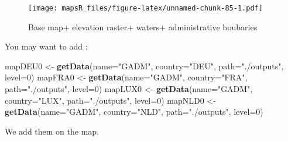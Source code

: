 \documentclass[]{report}
\newenvironment{Shaded}{\begin{snugshade}}{\end{snugshade}}
\newcommand{\KeywordTok}[1]{\textcolor[rgb]{0.13,0.29,0.53}{\textbf{{#1}}}}
\newcommand{\DataTypeTok}[1]{\textcolor[rgb]{0.13,0.29,0.53}{{#1}}}
\newcommand{\DecValTok}[1]{\textcolor[rgb]{0.00,0.00,0.81}{{#1}}}
\newcommand{\StringTok}[1]{\textcolor[rgb]{0.31,0.60,0.02}{{#1}}}
\newcommand{\OtherTok}[1]{\textcolor[rgb]{0.56,0.35,0.01}{{#1}}}
\newcommand{\NormalTok}[1]{{#1}}
\begin{document}
\begin{figure}[htbp]
\centering
\texttt{[image: mapsR\_files/figure-latex/unnamed-chunk-85-1.pdf]}
\caption{Base map+ elevation raster+ waters+ administrative boubaries}
\end{figure}

You may want to add :

\begin{Shaded}
\begin{Highlighting}[]
\NormalTok{mapDEU0 <-}\StringTok{ }\KeywordTok{getData}\NormalTok{(}\DataTypeTok{name=}\StringTok{"GADM"}\NormalTok{, }\DataTypeTok{country=}\StringTok{"DEU"}\NormalTok{, }\DataTypeTok{path=}\StringTok{"./outputs"}\NormalTok{, }\DataTypeTok{level=}\DecValTok{0}\NormalTok{)}
\NormalTok{mapFRA0 <-}\StringTok{ }\KeywordTok{getData}\NormalTok{(}\DataTypeTok{name=}\StringTok{"GADM"}\NormalTok{, }\DataTypeTok{country=}\StringTok{"FRA"}\NormalTok{, }\DataTypeTok{path=}\StringTok{"./outputs"}\NormalTok{, }\DataTypeTok{level=}\DecValTok{0}\NormalTok{)}
\NormalTok{mapLUX0 <-}\StringTok{ }\KeywordTok{getData}\NormalTok{(}\DataTypeTok{name=}\StringTok{"GADM"}\NormalTok{, }\DataTypeTok{country=}\StringTok{"LUX"}\NormalTok{, }\DataTypeTok{path=}\StringTok{"./outputs"}\NormalTok{, }\DataTypeTok{level=}\DecValTok{0}\NormalTok{)}
\NormalTok{mapNLD0 <-}\StringTok{ }\KeywordTok{getData}\NormalTok{(}\DataTypeTok{name=}\StringTok{"GADM"}\NormalTok{, }\DataTypeTok{country=}\StringTok{"NLD"}\NormalTok{, }\DataTypeTok{path=}\StringTok{"./outputs"}\NormalTok{, }\DataTypeTok{level=}\DecValTok{0}\NormalTok{)}
\end{Highlighting}
\end{Shaded}

We add them on the map.

\begin{Shaded}
\end{Shaded}
\end{document}
